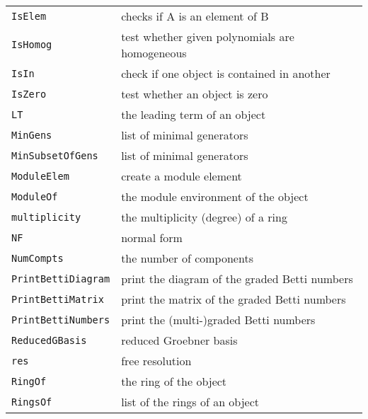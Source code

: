 \documentclass[a4paper]{mybook}
\begin{document}
\begin{center}
\begin{longtable}{ll}
{\verb~IsElem~} &
      checks if A is an element of B\\
   
{\verb~IsHomog~} &
      test whether given polynomials are homogeneous\\
   
{\verb~IsIn~} &
      check if one object is contained in another\\
   
{\verb~IsZero~} &
      test whether an object is zero\\
   
{\verb~LT~} &
      the leading term of an object\\
   
{\verb~MinGens~} &
      list of minimal generators\\
   
{\verb~MinSubsetOfGens~} &
      list of minimal generators\\
   
{\verb~ModuleElem~} &
      create a module element\\
   
{\verb~ModuleOf~} &
      the module environment of the object\\
   
{\verb~multiplicity~} &
      the multiplicity (degree) of a ring\\
   
{\verb~NF~} &
      normal form\\
   
{\verb~NumCompts~} &
      the number of components\\
   
{\verb~PrintBettiDiagram~} &
      print the diagram of the graded Betti numbers\\
   
{\verb~PrintBettiMatrix~} &
      print the matrix of the graded Betti numbers\\
   
{\verb~PrintBettiNumbers~} &
      print the (multi-)graded Betti numbers\\
   
{\verb~ReducedGBasis~} &
      reduced Groebner basis\\
   
{\verb~res~} &
      free resolution\\
   
{\verb~RingOf~} &
      the ring of the object\\
   
{\verb~RingsOf~} &
      list of the rings of an object\\
   

\end{longtable}
\end{center}
\end{document}
